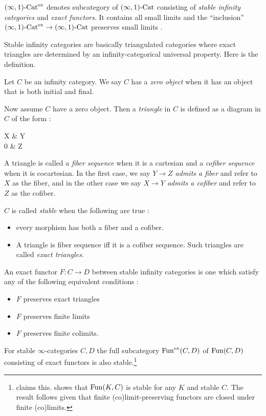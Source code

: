 \documentclass[./main.tex]{subfiles}
\begin{document}
  
$(\infty,1)\text{-}\mathrm{Cat}^\mathrm{ex}$ denotes subcategory of $(\infty,1)\text{-}\mathrm{Cat}$
consisting of \emph{stable infinity categories} and \emph{exact functors}.  
It contains all small limits and
the ``inclusion'' $(\infty,1)\text{-}\mathrm{Cat}^{\mathrm{ex}} \to (\infty,1)\text{-}\mathrm{Cat}$ preserves 
small limits \cite[Prop 1.1.4.4]{Lurie-HA}.

Stable infinity categories are basically
triangulated categories where exact triangles are determined by
an infinity-categorical universal property.
Here is the definition.
\begin{dfn}
  
  Let $C$ be an infinity category. 
  We say $C$ has a \emph{zero object} when
  it has an object that is both initial and final. 
  \cite[Def 1.1.1.1]{Lurie-HA}

  Now assume $C$ have a zero object.
  Then a \emph{triangle} in $C$ is defined as a diagram in $C$ of the form : 
  \begin{cd}
    X & Y \\
    0 & Z
    \arrow[from=1-1,to=1-2]
    \arrow[from=1-1,to=2-1]
    \arrow[from=1-2,to=2-2]
    \arrow[from=2-1,to=2-2]
  \end{cd}
  A triangle is called a \emph{fiber sequence} when it is a cartesian
  and a \emph{cofiber sequence} when it is cocartesian.
  \cite[Def 1.1.1.4]{Lurie-HA}
  In the first case,
  we say \emph{$Y \to Z$ admits a fiber} and refer to $X$ as the fiber,
  and in the other case
  we say \emph{$X \to Y$ admits a cofiber} and refer to $Z$ as the cofiber.

  $C$ is called \emph{stable} when the following are true : 
  \begin{itemize}
    \item every morphism has both a fiber and a cofiber.
    \item A triangle is fiber sequence iff it is a cofiber sequence.
    Such triangles are called \emph{exact triangles}.
  \end{itemize}
  \cite[Prop 1.1.1.9]{Lurie-HA}

  An exact functor $F : C \to D$ between stable infinity categories
  is one which satisfy any of the following equivalent conditions : 
  \cite[Prop 1.1.4.1]{Lurie-HA}
  \begin{itemize}
    \item $F$ preserves exact triangles
    \item $F$ preserves finite limits
    \item $F$ preserves finite colimits.
  \end{itemize}
  
  For stable $\infty$-categories $C, D$
  the full subcategory $\mathrm{Fun}^{\mathrm{ex}}(C,D)$ of $\mathrm{Fun}(C,D)$ consisting of
  exact functors is also stable.\footnote{
    \cite[Ch 1, 5.1.4]{GR1}claims this.
    \cite[Prop 1.1.3.1]{Lurie-HA} shows that $\mathrm{Fun}(K,C)$ is stable for
    any $K$ and stable $C$.
    The result follows given that
    finite (co)limit-preserving functors
    are closed under finite (co)limits.
  }
\end{dfn}
\end{document}
